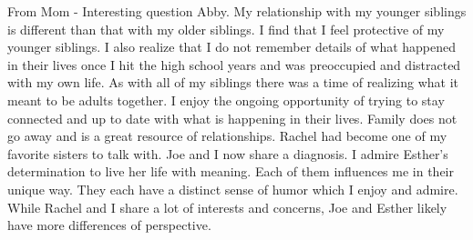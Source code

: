 From Mom - Interesting question Abby. My relationship with my younger siblings is different than that with my older siblings. I find that I feel protective of my younger siblings. I also realize that I do not remember details of what happened in their lives once I hit the high school years and was preoccupied and distracted with my own life. As with all of my siblings there was a time of realizing what it meant to be adults together. I enjoy the ongoing opportunity of trying to stay connected and up to date with what is happening in their lives. Family does not go away and is a great resource of relationships. Rachel had become one of my favorite sisters to talk with. Joe and I now share a diagnosis. I admire Esther's determination to live her life with meaning. Each of them influences me in their unique way. They each have a distinct sense of humor which I enjoy and admire. While Rachel and I share a lot of interests and concerns, Joe and Esther likely have more differences of perspective.




